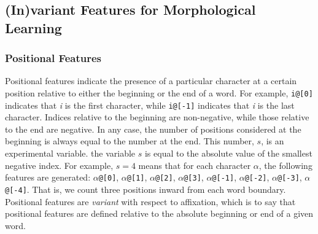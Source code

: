 
\subsection{(In)variant Features for Morphological Learning}

\subsubsection{Positional Features}
Positional features
indicate the presence of a particular
character at a certain position relative to either the beginning or the end of 
a word. For example, \texttt{i@[0]} indicates that \textit{i} is the first 
character, while \texttt{i@[-1]} indicates that \textit{i} is the last character. 
Indices relative to the beginning are non-negative, while those relative 
to the end are negative. In any case, the number of positions considered 
at the beginning is always equal to the number at the end. This number, 
$s$, is an experimental variable.
the variable $s$ is equal to the absolute value of the smallest negative index. 
For example, $s=4$ means that for each character $\alpha$, the following 
features are generated: $\alpha$\texttt{@[0]}, $\alpha$\texttt{@[1]}, 
$\alpha$\texttt{@[2]}, $\alpha$\texttt{@[3]}, $\alpha$\texttt{@[-1]}, $\alpha$\texttt{@[-2]}, 
$\alpha$\texttt{@[-3]}, $\alpha$\texttt{@[-4]}.
That is, we count three positions inward from each word boundary.
Positional features are \emph{variant} 
with respect to affixation, which is to say that positional features are 
defined relative to the absolute beginning 
or end of a given word. 

